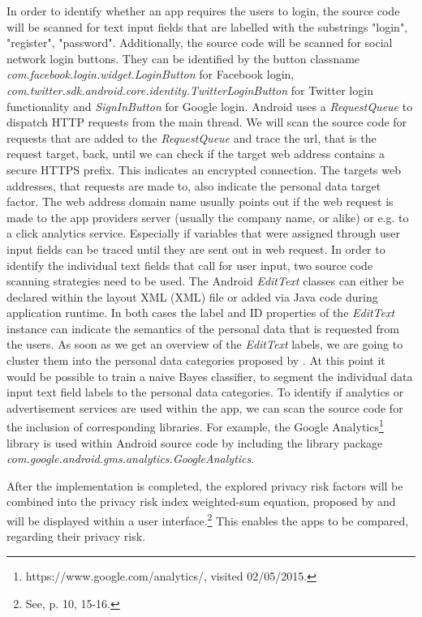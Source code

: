 \documentclass[
	a4paper,
	oneside,
	12pt,
	liststotocnumbered
]{article}
\let\cite\textcite
\begin{document}
In order to identify whether an app requires the users to login, the source code will be scanned for text input fields that are labelled with the substrings "login", "register", "password". 
Additionally, the source code will be scanned for social network login buttons.
They can be identified by the button classname \textit{com.facebook.login.widget.LoginButton} for Facebook login, \textit{com.twitter.sdk.android.core.identity.TwitterLoginButton} for Twitter login functionality and \textit{SignInButton} for Google login.
Android uses a \textit{RequestQueue} to dispatch HTTP requests from the main thread. 
We will scan the source code for requests that are added to the \textit{RequestQueue} and trace the url, that is the request target, back, until we can check if the target web address contains a secure HTTPS prefix.
This indicates an encrypted connection.
The targets web addresses, that requests are made to, also indicate the personal data target factor. The web address domain name usually points out if the web request is made to the app providers server (usually the company name, or alike) or e.g. to a click analytics service.
Especially if variables that were assigned through user input fields can be traced until they are sent out in web request.
In order to identify the individual text fields that call for user input, two source code scanning strategies need to be used.
The Android \textit{EditText} classes can either be declared within the layout \acl{XML} (\acs{XML}) file or added via Java code during application runtime.
In both cases the label and ID properties of the \textit{EditText} instance can indicate the semantics of the personal data that is requested from the users.
As soon as we get an overview of the \textit{EditText} labels, we are going to cluster them into the personal data categories proposed by \cite{Bruggemann2016}.
At this point it would be possible to train a naive Bayes classifier, to segment the individual data input text field labels to the personal data categories.
To identify if analytics or advertisement services are used within the app, we can scan the source code for the inclusion of corresponding libraries. For example, the Google Analytics\footnote{https://www.google.com/analytics/, visited 02/05/2015.} library is used within Android source code by including the library package \textit{com.google.android.gms.analytics.GoogleAnalytics}.

After the implementation is completed, the explored privacy risk factors will be combined into the privacy risk index weighted-sum equation, proposed by \cite{Bruggemann2016} and will be displayed within a user interface.\footnote{See\cite{Bruggemann2016}, p. 10, 15-16.}
This enables the \mH apps to be compared, regarding their privacy risk.
\end{document}
